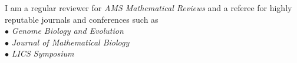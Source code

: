 \documentclass[12pt]{article}
\begin{document}
\noindent I am a regular reviewer for {\em AMS Mathematical Reviews} and a referee for highly reputable journals and conferences such as\\
$\bullet$ {\em Genome Biology and Evolution}\\
$\bullet$ {\em Journal of Mathematical Biology}\\
$\bullet$ {\em LICS Symposium}
\vskip30pt
\iftoggle{full}{
\flushright{This CV: \url{https://gavruskin.github.io/AGcv.pdf}}
}{
\flushright{This CV: \url{https://gavruskin.github.io/AGcv_short.pdf}}
}
\end{document}
